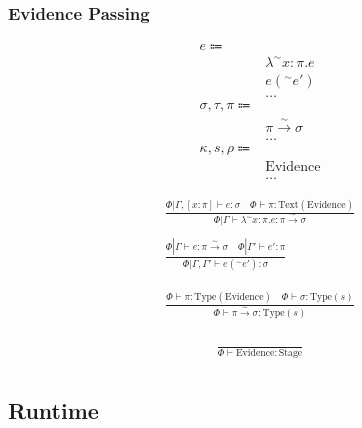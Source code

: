 \documentclass {article}
\begin{document}
\subsubsection{Evidence Passing}
\begin{align*}
e \Coloneqq & \\
& \lambda^\sim x : \pi. e \tag{Evidence Lambda} \\
& e (^\sim e') \tag{Evidence Application} \\
& \dots \\
\sigma, \tau, \pi \Coloneqq & \\
& \pi \xrightarrow{\sim} \sigma \tag{Evidence Function} \\
& \dots \\
\kappa, s, \rho \Coloneqq & \\
& \text{Evidence} \tag{Evidence Stage} \\
& \dots
\end{align*}

\begin{gather*}
\frac
{\Phi | \Gamma, [x : \pi] \vdash e : \sigma \quad \Phi \vdash \pi : \text{Text}(\text{Evidence})}
{\Phi | \Gamma \vdash \lambda^\sim x : \pi. e : \pi \xrightarrow{\sim} \sigma} \\
\\
\frac
{\Phi | \Gamma \vdash e : \pi \xrightarrow{\sim} \sigma \quad \Phi | \Gamma' \vdash e' : \pi }
{\Phi | \Gamma, \Gamma' \vdash e (^\sim e') : \sigma}
\end{gather*}

\begin{gather*}
\frac
{\Phi \vdash \pi : \text{Type}(\text{Evidence}) \quad \Phi \vdash \sigma : \text{Type}(s)}
{\Phi \vdash \pi \xrightarrow{\sim} \sigma : \text{Type}(s)} \\
\end{gather*}

\begin{gather*}
\frac
{}
{\Phi \vdash \text{Evidence} : \text{Stage}} \\
\end{gather*}

\subsection{Runtime}
\end{document}
